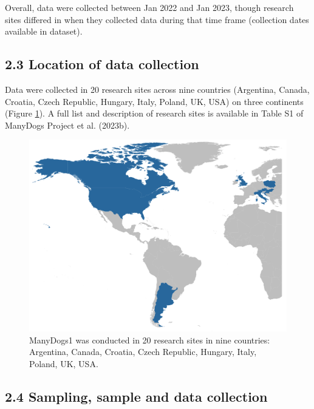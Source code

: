 \documentclass[
  pub,floatsintext]{apa6}
\begin{document}
Overall, data were collected between Jan 2022 and Jan 2023, though research sites differed in when they collected data during that time frame (collection dates available in dataset).

\hypertarget{location-of-data-collection}{%
\subsection{2.3 Location of data collection}\label{location-of-data-collection}}

Data were collected in 20 research sites across nine countries (Argentina, Canada, Croatia, Czech Republic, Hungary, Italy, Poland, UK, USA) on three continents (Figure \ref{fig:countries}). A full list and description of research sites is available in Table S1 of ManyDogs Project et al. (2023b).

\begin{figure}

{\centering \includegraphics[width=1\linewidth]{md1_countries} 

}

\caption{ManyDogs1 was conducted in 20 research sites in nine countries: Argentina, Canada, Croatia, Czech Republic, Hungary, Italy, Poland, UK, USA.}\label{fig:countries}
\end{figure}

\hypertarget{sampling-sample-and-data-collection}{%
\subsection{2.4 Sampling, sample and data collection}\label{sampling-sample-and-data-collection}}
\end{document}
